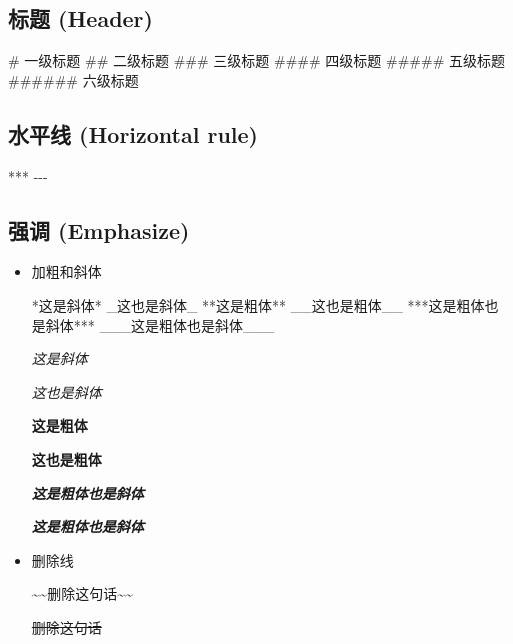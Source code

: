 \documentclass[]{ctexbook}
\newenvironment{Shaded}{\begin{snugshade}}{\end{snugshade}}
\newcommand{\FunctionTok}[1]{\textcolor[rgb]{0.00,0.00,0.00}{#1}}
\newcommand{\NormalTok}[1]{#1}
\begin{document}
\hypertarget{ux6807ux9898-header}{%
\subsection{标题 (Header)}\label{ux6807ux9898-header}}

\begin{Shaded}
\begin{Highlighting}[]
\FunctionTok{\# 一级标题}
\FunctionTok{\#\# 二级标题}
\FunctionTok{\#\#\# 三级标题}
\FunctionTok{\#\#\#\# 四级标题}
\FunctionTok{\#\#\#\#\# 五级标题}
\FunctionTok{\#\#\#\#\#\# 六级标题}
\end{Highlighting}
\end{Shaded}

\hypertarget{ux6c34ux5e73ux7ebf-horizontal-rule}{%
\subsection{水平线 (Horizontal rule)}\label{ux6c34ux5e73ux7ebf-horizontal-rule}}

\begin{Shaded}
\begin{Highlighting}[]
\NormalTok{***}
\NormalTok{{-}{-}{-}}
\end{Highlighting}
\end{Shaded}

\hypertarget{ux5f3aux8c03-emphasize}{%
\subsection{强调 (Emphasize)}\label{ux5f3aux8c03-emphasize}}

\begin{itemize}
\item
  加粗和斜体

\begin{Shaded}
\begin{Highlighting}[]
\NormalTok{*这是斜体*}
\NormalTok{\_这也是斜体\_}
\NormalTok{**这是粗体**}
\NormalTok{\_\_这也是粗体\_\_}
\NormalTok{***这是粗体也是斜体***}
\NormalTok{\_\_\_这是粗体也是斜体\_\_\_}
\end{Highlighting}
\end{Shaded}

  \emph{这是斜体}

  \emph{这也是斜体}

  \textbf{这是粗体}

  \textbf{这也是粗体}

  \textbf{\emph{这是粗体也是斜体}}

  \textbf{\emph{这是粗体也是斜体}}
\item
  删除线

\begin{Shaded}
\begin{Highlighting}[]
\NormalTok{\textasciitilde{}\textasciitilde{}删除这句话\textasciitilde{}\textasciitilde{}}
\end{Highlighting}
\end{Shaded}

  \sout{删除这句话}
\end{itemize}
\end{document}
